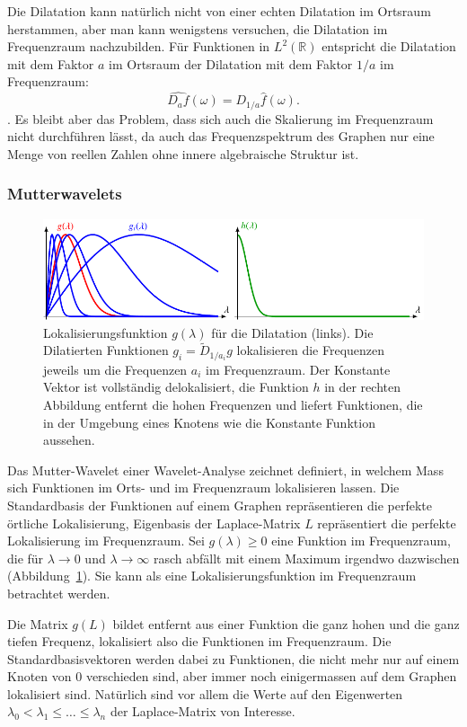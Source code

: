 Die Dilatation kann natürlich nicht von einer echten
Dilatation im Ortsraum herstammen, aber man kann wenigstens versuchen, die
Dilatation im Frequenzraum nachzubilden.
Für Funktionen in $L^2(\mathbb{R})$ entspricht die Dilatation mit dem
Faktor $a$ im Ortsraum der Dilatation mit dem Faktor $1/a$ im Frequenzraum:
\[
\widehat{D_af}(\omega) = D_{1/a}\hat{f}(\omega).
\]
\cite[Satz~3.14]{buch:mathsem-wavelets}.
Es bleibt aber das Problem, dass sich auch die Skalierung im Frequenzraum
nicht durchführen lässt, da auch das Frequenzspektrum des Graphen nur eine
Menge von reellen Zahlen ohne innere algebraische Struktur ist.

\subsubsection{Mutterwavelets}
\begin{figure}
\centering
\includegraphics{chapters/70-graphen/images/gh.pdf}
\caption{Lokalisierungsfunktion $g(\lambda)$ für die Dilatation (links).
Die Dilatierten Funktionen $g_i=\tilde{D}_{1/a_i}g$ lokalisieren
die Frequenzen jeweils um die Frequenzen $a_i$ im Frequenzraum.
Der Konstante Vektor ist vollständig delokalisiert, die Funktion $h$
in der rechten Abbildung entfernt die hohen Frequenzen und liefert Funktionen,
die in der Umgebung eines Knotens wie die Konstante Funktion aussehen.
\label{buch:graphs:fig:lokalisierung}}
\end{figure}
Das Mutter-Wavelet einer Wavelet-Analyse zeichnet definiert, in welchem Mass
sich Funktionen im Orts- und im Frequenzraum lokalisieren lassen.
Die Standardbasis der Funktionen auf einem Graphen repräsentieren die
perfekte örtliche Lokalisierung, Eigenbasis der Laplace-Matrix $L$ repräsentiert
die perfekte Lokalisierung im Frequenzraum.
Sei $g(\lambda)\ge 0$ eine Funktion im Frequenzraum, die für  $\lambda\to0$ und
$\lambda\to\infty$ rasch abfällt mit einem Maximum irgendwo dazwischen
(Abbildung~\ref{buch:graphs:fig:lokalisierung}).
Sie kann als eine Lokalisierungsfunktion im Frequenzraum betrachtet werden.

Die Matrix $g(L)$ bildet entfernt aus einer Funktion die ganz hohen und 
die ganz tiefen Frequenz, lokalisiert also die Funktionen im Frequenzraum.
Die Standardbasisvektoren werden dabei zu Funktionen, die nicht mehr nur
auf einem Knoten von $0$ verschieden sind, aber immer noch einigermassen
auf dem Graphen lokalisiert sind.
Natürlich sind vor allem die Werte auf den Eigenwerten
$\lambda_0 < \lambda_1\le \dots\le \lambda_n$ der Laplace-Matrix
von Interesse.

